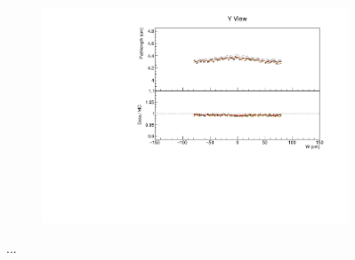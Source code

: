 \documentclass[12pt,a4paper]{article}
\begin{document}
\begin{figure}[!ht]
\begin{subfigure}{0.5\textwidth}
  \end{subfigure}
  \begin{subfigure}{0.5\textwidth}
    \includegraphics[width=\linewidth]{essentialsec_tb/cm_w_y.pdf}
  \end{subfigure}
  \caption{...}
  \label{figAbsCalibW2}
\end{figure}
\end{document}
